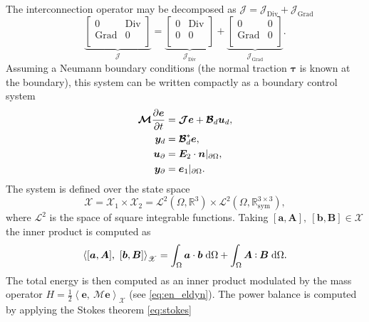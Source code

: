 \documentclass{svjour3}                     %
\DeclareMathOperator*{\Grad}{Grad}
\DeclareMathOperator*{\Div}{Div}
\def\onedot{$\mathsurround0pt\ldotp$}
\def\cddot{%
	\mathbin{\vcenter{\baselineskip.67ex
			\hbox{\onedot}\hbox{\onedot}}%
}}
\begin{document}
	The interconnection operator may be decomposed as $\bm{\mathcal{J}} = \bm{\mathcal{J}}_{\Div} + \bm{\mathcal{J}}_{\Grad}$
	\begin{equation}
	\underbrace{\begin{bmatrix}
		0 & \Div \\ \Grad & 0 \\
		\end{bmatrix}}_{\bm{\mathcal{J}}} = 
	\underbrace{\begin{bmatrix}
		0 & \Div \\ 0  & 0 \\
		\end{bmatrix}}_{\bm{\mathcal{J}}_{\Div}} + 
	\underbrace{\begin{bmatrix}
		0 & 0 \\ \Grad & 0 \\
		\end{bmatrix}}_{\bm{\mathcal{J}}_{\Grad}}.
	\end{equation}
	Assuming a Neumann boundary conditions (the normal traction $\bm\tau$ is known at the boundary), this system can be written compactly as a boundary control system
	\begin{equation}
	\label{eq:eldyn_PDE}
	\begin{aligned}
	\bm{\mathcal{M}} \diffp{\bm{e}}{t} &= \bm{\mathcal{J}} \bm{e} + \bm{\mathcal{B}}_d \bm{u}_d, \\
	\bm{y}_d &= \bm{\mathcal{B}}_d^* \bm{e}, \\
	\bm{u}_\partial &= \bm{E}_2 \cdot \bm{n}|_{\partial\Omega}, \\
	\bm{y}_\partial &= \bm{e}_1|_{\partial\Omega}.
	\end{aligned}
	\end{equation}
	The system is defined over the state space
	\[
	\mathscr{X} = \mathscr{X}_1 \times \mathscr{X}_2 = \mathscr{L}^2(\Omega, \mathbb{R}^3) \times\mathscr{L}^2(\Omega, \mathbb{R}^{3\times 3}_{\text{sym}}),
	\]
	where $\mathscr{L}^2$ is the space of square integrable functions. Taking  $[\bm{a}, \bm{A}], \ [\bm{b}, \bm{B}] \in \mathscr{X}$ the inner product is computed as
	\[
	\left\langle [\bm{a}, \bm{A}], \ [\bm{b}, \bm{B}] \right\rangle_{\mathscr{X}} = \int_{\Omega} \bm{a} \cdot \bm{b} \d{\Omega} + \int_{\Omega} \bm{A} \cddot \bm{B} \d{\Omega}.
	\]
	The total energy is then computed as an inner product modulated by the mass operator $H = \frac{1}{2} \left\langle \bm{e}, \ \bm{\mathcal{M}} \bm{e} \right\rangle_{\mathscr{X}}$ (see \eqref{eq:en_eldyn}). The power balance is computed by applying the Stokes theorem \eqref{eq:stokes}
\end{document}
